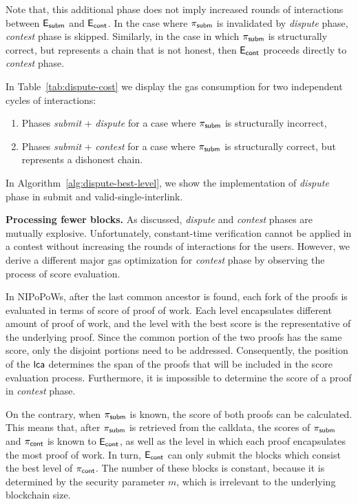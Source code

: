 Note that, this additional phase does not imply increased rounds of
interactions between $\mathsf{E_{subm}}$ and $\mathsf{E_{cont}}$. In the case where $\mathsf{\pi_{subm}}$ is invalidated
by \emph{dispute} phase, \emph{contest} phase is skipped.  Similarly, in the
case in which $\mathsf{\pi_{subm}}$ is structurally correct, but represents a chain that is
not honest, then $\mathsf{E_{cont}}$ proceeds directly to \emph{contest} phase.

In Table~\ref{tab:dispute-cost} we display the gas consumption for
two independent cycles of interactions:
\begin{enumerate}
    \item Phases \emph{submit} + \emph{dispute} for a case where $\mathsf{\pi_{subm}}$
is structurally incorrect,
    \item Phases \emph{submit} + \emph{contest} for a case where
$\mathsf{\pi_{subm}}$ is structurally correct, but represents a dishonest chain.
\end{enumerate}
\noindent
In Algorithm~\ref{alg:dispute-best-level}, we show the implementation of
\emph{dispute} phase in \textsf{submit} and \textsf{valid-single-interlink}.




\textbf{Processing fewer blocks.} As discussed, \emph{dispute} and
\emph{contest} phases are mutually explosive. Unfortunately, constant-time
verification cannot be applied in a contest without increasing the rounds
of interactions for the users. However, we derive a different major gas
optimization for \emph{contest} phase by observing the process of score
evaluation.

In NIPoPoWs, after the last common ancestor is found, each fork of the proofs
is evaluated in terms of score of proof of work. Each level encapsulates
different amount of proof of work, and the level with the best score is the
representative of the underlying proof. Since the common portion of the two
proofs has the same score, only the disjoint portions need to be addressed.
Consequently, the position of the $\mathsf{lca}$ determines the span of the proofs that
will be included in the score evaluation process. Furthermore, it is impossible
to determine the score of a proof in \emph{contest} phase.

On the contrary, when $\mathsf{\pi_{subm}}$ is known, the score of both proofs can be
calculated. This means that, after $\mathsf{\pi_{subm}}$ is retrieved from the calldata, the
scores of $\mathsf{\pi_{subm}}$ and $\mathsf{\pi_{cont}}$ is known to $\mathsf{E_{cont}}$, as well as the level in which
each proof encapsulates the most proof of work. In turn, $\mathsf{E_{cont}}$ can only submit
the blocks which consist the best level of $\mathsf{\pi_{cont}}$. The number of these blocks
is constant, because it is determined by the security parameter $m$, which is
irrelevant to the underlying blockchain size.

